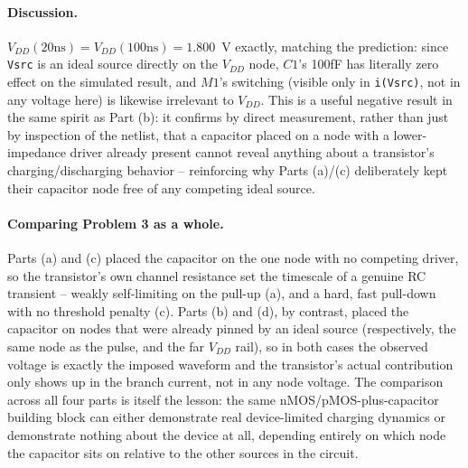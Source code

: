 \paragraph{Discussion.} $V_{DD}(20\text{ns}) = V_{DD}(100\text{ns}) = 1.800$~V exactly, matching the prediction: since \texttt{Vsrc} is an ideal source directly on the $V_{DD}$ node, $C1$'s 100fF has literally zero effect on the simulated result, and $M1$'s switching (visible only in \texttt{i(Vsrc)}, not in any voltage here) is likewise irrelevant to $V_{DD}$. This is a useful negative result in the same spirit as Part (b): it confirms by direct measurement, rather than just by inspection of the netlist, that a capacitor placed on a node with a lower-impedance driver already present cannot reveal anything about a transistor's charging/discharging behavior -- reinforcing why Parts (a)/(c) deliberately kept their capacitor node free of any competing ideal source.

\paragraph{Comparing Problem 3 as a whole.} Parts (a) and (c) placed the capacitor on the one node with no competing driver, so the transistor's own channel resistance set the timescale of a genuine RC transient -- weakly self-limiting on the pull-up (a), and a hard, fast pull-down with no threshold penalty (c). Parts (b) and (d), by contrast, placed the capacitor on nodes that were already pinned by an ideal source (respectively, the same node as the pulse, and the far $V_{DD}$ rail), so in both cases the observed voltage is exactly the imposed waveform and the transistor's actual contribution only shows up in the branch current, not in any node voltage. The comparison across all four parts is itself the lesson: the same nMOS/pMOS-plus-capacitor building block can either demonstrate real device-limited charging dynamics or demonstrate nothing about the device at all, depending entirely on which node the capacitor sits on relative to the other sources in the circuit.
